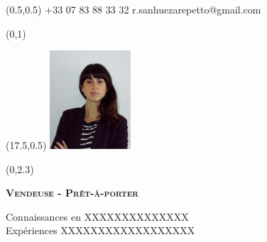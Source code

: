 \documentclass[30pt, french]{tccv}
\begin{document}
\begin{upshape}
\fontsize{9pt}{1em}\color{text}\selectfont



%
%




\begin{textblock}{6.5}(0.5,0.5)
    {+33 07 83 88 33 32}
    {r.sanhuezarepetto@gmail.com}
\end{textblock}

\begin{textblock}{21}(0,1)
\end{textblock}

\begin{textblock}{21}(17.5,0.5)
		\includegraphics[width=3cm]{../Figure/Rocio3.png}
\end{textblock}  



\begin{textblock}{21}(0,2.3)

\begin{center}
\fontsize{10pt}{1.5em}\color{text}\bodyfontlight\upshape\selectfont

	{\fontsize{14pt}{5em}\scshape\bfseries Vendeuse - Prêt-à-porter  \\} 

	\vspace{5pt}
Connaissances en XXXXXXXXXXXXXX 			\\
Expériences  XXXXXXXXXXXXXXXXXX 		 	\\

\end{center}
\end{textblock}  






\end{upshape}
\end{document}
